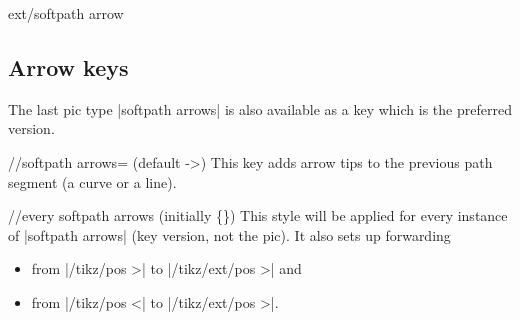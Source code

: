 \begin{multicols}{2}
\begin{pictype}{ext/softpath arrow}{}
\begin{codeexample}[preamble=\usetikzlibrary{arrows.meta, bending, ext.arrows-plus}]
\end{codeexample}
\end{pictype}

\subsection{Arrow keys}
The last pic type |softpath arrows| is also available as a key
which is the preferred version.
\begin{key}{/\tikzext/softpath arrows= (default ->)}
This key adds arrow tips to the previous path segment (a curve or a line).

\begin{stylekey}{/\tikzext/every softpath arrows (initially \{\})}
This style will be applied for every instance of |softpath arrows| (key version, not the pic).
It also sets up forwarding
\begin{itemize}
  \item from |/tikz/pos >| to |/tikz/ext/pos >| and
  \item from |/tikz/pos <| to |/tikz/ext/pos >|.
\end{itemize}
\end{stylekey}
\end{key}


\end{multicols}
